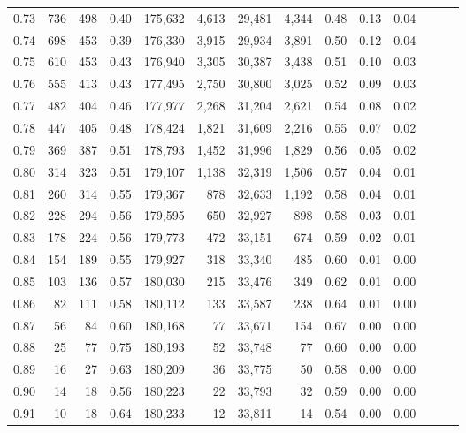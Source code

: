 \begin{tabular}{rrrrrrrrrrrrrr}
0.73 &    736 &  498 &  0.40 &  175,632 &    4,613 &  29,481 &   4,344 &  0.48 &  0.13 &      0.04 \\
0.74 &    698 &  453 &  0.39 &  176,330 &    3,915 &  29,934 &   3,891 &  0.50 &  0.12 &      0.04 \\
0.75 &    610 &  453 &  0.43 &  176,940 &    3,305 &  30,387 &   3,438 &  0.51 &  0.10 &      0.03 \\
0.76 &    555 &  413 &  0.43 &  177,495 &    2,750 &  30,800 &   3,025 &  0.52 &  0.09 &      0.03 \\
0.77 &    482 &  404 &  0.46 &  177,977 &    2,268 &  31,204 &   2,621 &  0.54 &  0.08 &      0.02 \\
0.78 &    447 &  405 &  0.48 &  178,424 &    1,821 &  31,609 &   2,216 &  0.55 &  0.07 &      0.02 \\
0.79 &    369 &  387 &  0.51 &  178,793 &    1,452 &  31,996 &   1,829 &  0.56 &  0.05 &      0.02 \\
0.80 &    314 &  323 &  0.51 &  179,107 &    1,138 &  32,319 &   1,506 &  0.57 &  0.04 &      0.01 \\
0.81 &    260 &  314 &  0.55 &  179,367 &      878 &  32,633 &   1,192 &  0.58 &  0.04 &      0.01 \\
0.82 &    228 &  294 &  0.56 &  179,595 &      650 &  32,927 &     898 &  0.58 &  0.03 &      0.01 \\
0.83 &    178 &  224 &  0.56 &  179,773 &      472 &  33,151 &     674 &  0.59 &  0.02 &      0.01 \\
0.84 &    154 &  189 &  0.55 &  179,927 &      318 &  33,340 &     485 &  0.60 &  0.01 &      0.00 \\
0.85 &    103 &  136 &  0.57 &  180,030 &      215 &  33,476 &     349 &  0.62 &  0.01 &      0.00 \\
0.86 &     82 &  111 &  0.58 &  180,112 &      133 &  33,587 &     238 &  0.64 &  0.01 &      0.00 \\
0.87 &     56 &   84 &  0.60 &  180,168 &       77 &  33,671 &     154 &  0.67 &  0.00 &      0.00 \\
0.88 &     25 &   77 &  0.75 &  180,193 &       52 &  33,748 &      77 &  0.60 &  0.00 &      0.00 \\
0.89 &     16 &   27 &  0.63 &  180,209 &       36 &  33,775 &      50 &  0.58 &  0.00 &      0.00 \\
0.90 &     14 &   18 &  0.56 &  180,223 &       22 &  33,793 &      32 &  0.59 &  0.00 &      0.00 \\
0.91 &     10 &   18 &  0.64 &  180,233 &       12 &  33,811 &      14 &  0.54 &  0.00 &      0.00 \\

\end{tabular}
